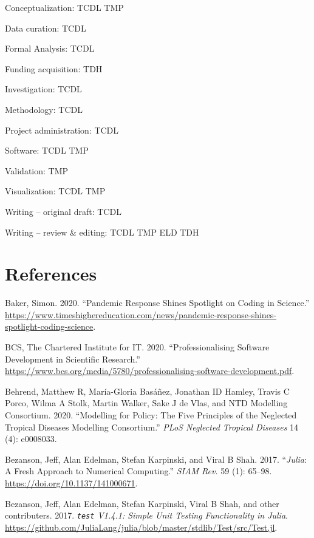 \documentclass[]{elsarticle} %
\begin{document}
Conceptualization: TCDL TMP

Data curation: TCDL

Formal Analysis: TCDL

Funding acquisition: TDH

Investigation: TCDL

Methodology: TCDL

Project administration: TCDL

Software: TCDL TMP

Validation: TMP

Visualization: TCDL TMP

Writing -- original draft: TCDL

Writing -- review \& editing: TCDL TMP ELD TDH

\hypertarget{references}{%
\section*{References}\label{references}}

\hypertarget{refs}{}
\leavevmode\hypertarget{ref-funds}{}%
Baker, Simon. 2020. ``Pandemic Response Shines Spotlight on Coding in Science.'' \url{https://www.timeshighereducation.com/news/pandemic-response-shines-spotlight-coding-science}.

\leavevmode\hypertarget{ref-it}{}%
BCS, The Chartered Institute for IT. 2020. ``Professionalising Software Development in Scientific Research.'' \url{https://www.bcs.org/media/5780/professionalising-software-development.pdf}.

\leavevmode\hypertarget{ref-behrend2020modelling}{}%
Behrend, Matthew R, María-Gloria Basáñez, Jonathan ID Hamley, Travis C Porco, Wilma A Stolk, Martin Walker, Sake J de Vlas, and NTD Modelling Consortium. 2020. ``Modelling for Policy: The Five Principles of the Neglected Tropical Diseases Modelling Consortium.'' \emph{PLoS Neglected Tropical Diseases} 14 (4): e0008033.

\leavevmode\hypertarget{ref-bezanson2017julia}{}%
Bezanson, Jeff, Alan Edelman, Stefan Karpinski, and Viral B Shah. 2017. ``\emph{Julia}: A Fresh Approach to Numerical Computing.'' \emph{SIAM Rev.} 59 (1): 65--98. \url{https://doi.org/10.1137/141000671}.

\leavevmode\hypertarget{ref-juliatest}{}%
Bezanson, Jeff, Alan Edelman, Stefan Karpinski, Viral B Shah, and other contributers. 2017. \emph{\texttt{test} V1.4.1: Simple Unit Testing Functionality in Julia}. \url{https://github.com/JuliaLang/julia/blob/master/stdlib/Test/src/Test.jl}.
\end{document}
